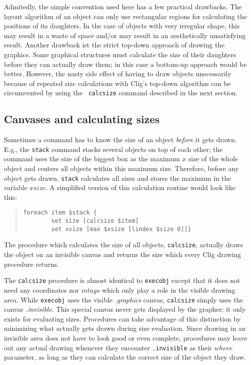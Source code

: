 Admitedly, the simple convention used here has a few practical
drawbacks. The layout algorithm of an object can only use rectangular
regions for calculating the positions of its daughters. In the case of
objects with very irregular shape, this may result in a waste of space
and/or may result in an aesthetically unsatisfying result. Another
drawback ist the strict top-down approach of drawing the graphics.
Some graphical structures must calculate the size of their daughters
before they can actually draw them; in this case a bottom-up approach
would be better. However, the nasty side effect of having to draw
objects unecessarily because of repeated size calculations with {\sc
Clig}'s top-down algorithm can be circumvented by using the {\tt
calcsize} command described in the next section.

\subsection{Canvases and calculating sizes}

Sometimes a command has to know the size of an object {\em before\/} it
gets drawn. E.g., the {\tt stack} command stacks several objects on top
of each other; the command uses the size of the biggest box as the
maximum $x$ size of the whole object and centers all objects within
this maximum size. Therefore, before any object gets drawn, {\tt stack}
calculates all sizes and stores the maximum in the variable $xsize$. A
simplified version of this calculation routine would look like this:

\begin{quote}
\begin{verbatim}
foreach item $stack {
        set size [calcsize $item]
        set xsize [max $xsize [lindex $size 0]]}
\end{verbatim}
\end{quote}

The procedure which calculates the size of all objects, {\tt calcsize},
actually draws the object on an invisible canvas and returns the
size which every {\sc Clig} drawing procedure returns.

The {\tt calcsize} procedure is almost identical to {\tt execobj}
except that it does not need any coordinates nor $mtags$ which only
play a role in the visible drawing area. While {\tt execobj} uses the
visible {\it .graphics} canvas, {\tt calcsize} simply uses the canvas
{\it .invisible}. This special canvas never gets displayed by the
grapher; it only exists for evaluating sizes. Procedures can take
advantage of this distinction by minimizing what actually gets drawn
during size evaluation. Since drawing in an invisible area does not
have to look good or even complete, procedures may leave out any
actual drawing whenever they encounter {\tt .invisible} as their
$where$ parameter, as long as they can calculate the correct size of
the object they draw.

